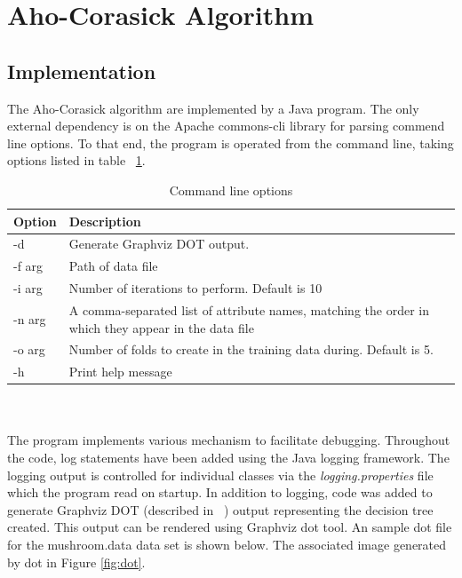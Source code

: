 \documentclass[10pt]{report}
\begin{document}
\section{Aho-Corasick Algorithm}
\label{sec:ahocorasickalgorithm}

\subsection*{Implementation}
The Aho-Corasick algorithm are implemented by a Java
program. The only external dependency is on the Apache commons-cli
library for parsing commend line options. To that end, the program is
operated from the command line, taking options listed in table
~\ref{tab:ahocommandline}.  
\\
\begin{table}[h]
  \centering
  \begin{tabular}{ |l|p{10cm}|} 
    \hline
    Option & Description \\ \hline
    -d          &  Generate Graphviz DOT output. \\ \hline
    -f \<arg\>  &  Path of data file \\ \hline
    -i \<arg\>  &  Number of iterations to perform. Default is 10 \\ \hline
    -n \<arg\>  &  A comma-separated list of attribute names, matching
    the order in which they appear in the data file \\ \hline
    -o \<arg\>  &  Number of folds to create in the training data during. Default is 5. \\ \hline
    -h          &  Print help message \\ \hline
  \end{tabular}
  \caption{Command line options}
  \label{tab:ahocommandline}
\end{table}
\\\\

The program implements various mechanism to facilitate
debugging. Throughout the code, log statements have been added using
the Java logging framework. The logging output is controlled for
individual classes via the \textit{logging.properties} file which the program
read on startup. In addition to logging, code was added to generate
Graphviz DOT (described in ~\cite{RefWorks:110}) output representing
the decision tree created. This output can be rendered using Graphviz
dot tool. An sample dot file for the mushroom.data data set is shown
below. The associated image generated by dot in Figure \ref{fig:dot}.
\end{document}
